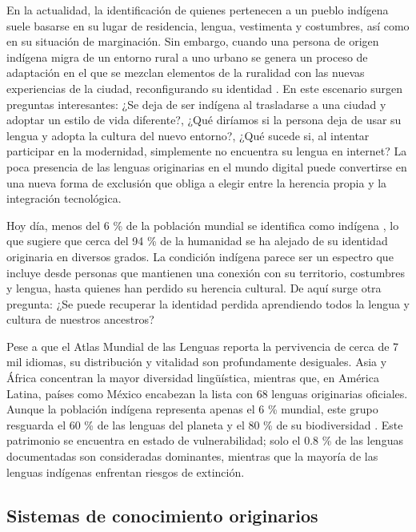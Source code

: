 \documentclass[spanish]{textolivre}
\begin{document}
En la actualidad, la identificación de quienes pertenecen a un pueblo indígena suele basarse en su lugar de residencia, lengua, vestimenta y costumbres, así como en su situación de marginación. Sin embargo, cuando una persona de origen indígena migra de un entorno rural a uno urbano se genera un proceso de adaptación en el que se mezclan elementos de la ruralidad con las nuevas experiencias de la ciudad, reconfigurando su identidad \cite{Corona2023}. En este escenario surgen preguntas interesantes: ¿Se deja de ser indígena al trasladarse a una ciudad y adoptar un estilo de vida diferente?, ¿Qué diríamos si la persona deja de usar su lengua y adopta la cultura del nuevo entorno?, ¿Qué sucede si, al intentar participar en la modernidad, simplemente no encuentra su lengua en internet? La poca presencia de las lenguas originarias en el mundo digital puede convertirse en una nueva forma de exclusión que obliga a elegir entre la herencia propia y la integración tecnológica.

Hoy día, menos del 6 \% de la población mundial se identifica como indígena \cite{Ivers2023}, lo que sugiere que cerca del 94 \% de la humanidad se ha alejado de su identidad originaria en diversos grados. La condición indígena parece ser un espectro que incluye desde personas que mantienen una conexión con su territorio, costumbres y lengua, hasta quienes han perdido su herencia cultural. De aquí surge otra pregunta: ¿Se puede recuperar la identidad perdida aprendiendo todos la lengua y cultura de nuestros ancestros?

Pese a que el Atlas Mundial de las Lenguas \cite{UNESCOWorldAtlasLanguages} reporta la pervivencia de cerca de 7 mil idiomas, su distribución y vitalidad son profundamente desiguales. Asia y África concentran la mayor diversidad lingüística, mientras que, en América Latina, países como México encabezan la lista con 68 lenguas originarias oficiales. Aunque la población indígena representa apenas el 6 \% mundial, este grupo resguarda el 60 \% de las lenguas del planeta y el 80 \% de su biodiversidad \cite{Ivers2023}. Este patrimonio se encuentra en estado de vulnerabilidad; solo el 0.8 \% de las lenguas documentadas son consideradas dominantes, mientras que la mayoría de las lenguas indígenas enfrentan riesgos de extinción.

\subsection{Sistemas de conocimiento originarios}
\end{document}
